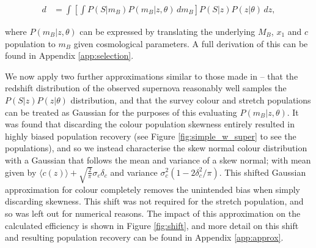 \documentclass[a4paper,fleqn,usenatbib]{mnras}
\newcommand{\rubin}{\citetalias{Rubin2015}}
\begin{document}
\begin{align}
d &= \int  \left[ \int P(S|m_B) P(m_B | z, \theta)\, d m_B \right] P(S|z) P(z|\theta)\, dz, \label{eq:w1}
\end{align}

where $P(m_B | z, \theta)$ can be expressed by translating the underlying $M_B$, $x_1$ and $c$ population to $m_B$ given cosmological parameters. A full derivation of this can be found in Appendix \ref{app:selection}.

We now apply two further approximations similar to those made in {\rubin} -- that the redshift distribution of the observed supernova reasonably well samples the $P(S|z)P(z|\theta)$ distribution, and that the survey colour and stretch populations can be treated as Gaussian for the purposes of this evaluating $P(m_B | z, \theta)$. It was found that discarding the colour population skewness entirely resulted in highly biased population recovery (see Figure \ref{fig:simple_w_super} to see the populations), and so we instead characterise the skew normal colour distribution with a Gaussian that follows the mean and variance of a skew normal; with mean given by $\langle c(z) \rangle + \sqrt{\frac{2}{\pi}} \sigma_c \delta_c$ and variance $\sigma_c^2(1 - 2\delta_c^2/\pi)$. This shifted Gaussian approximation for colour completely removes the unintended bias when simply discarding skewness. This shift was not required for the stretch population, and so was left out for numerical reasons. The impact of this approximation on the calculated efficiency is shown in Figure \ref{fig:shift}, and more detail on this shift and resulting population recovery can be found in Appendix \ref{app:approx}. 
\end{document}
